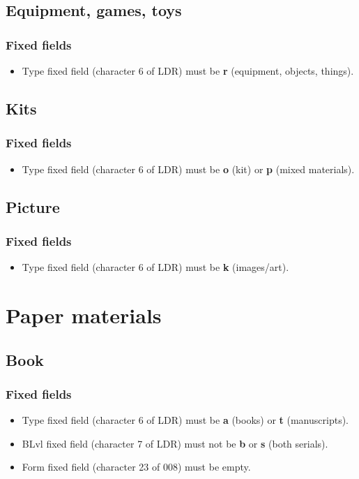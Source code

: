 \documentclass[a4paper,10pt]{amsart}
\let\stdsection\section
\renewcommand\section{\newpage\stdsection}
\begin{document}
\subsection{Equipment, games, toys}
\subsubsection*{Fixed fields}
\begin{itemize}
 \item Type fixed field (character 6 of LDR) must be {\bf r} (equipment, objects, things).
\end{itemize}

\subsection{Kits}
\subsubsection*{Fixed fields}
\begin{itemize}
 \item Type fixed field (character 6 of LDR) must be {\bf o} (kit) or {\bf p} (mixed materials).
\end{itemize}

\subsection{Picture}
\subsubsection*{Fixed fields}
\begin{itemize}
 \item Type fixed field (character 6 of LDR) must be {\bf k} (images/art).
\end{itemize}



\section{Paper materials}
\subsection{Book}
\subsubsection*{Fixed fields}
\begin{itemize}
 \item Type fixed field (character 6 of LDR) must be {\bf a} (books) or {\bf t} (manuscripts).
 \item BLvl fixed field (character 7 of LDR) must not be {\bf b} or {\bf s} (both serials).
 \item Form fixed field (character 23 of 008) must be empty.
\end{itemize}
\end{document}
